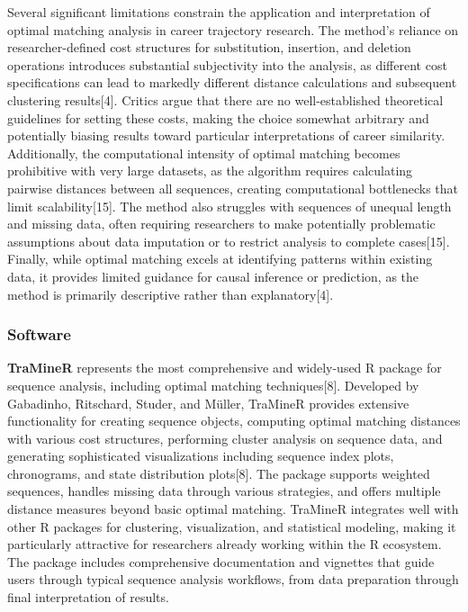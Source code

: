 \documentclass[./main.tex]{subfiles}
\begin{document}
Several significant limitations constrain the application and
interpretation of optimal matching analysis in career trajectory
research. The method's reliance on researcher-defined cost structures
for substitution, insertion, and deletion operations introduces
substantial subjectivity into the analysis, as different cost
specifications can lead to markedly different distance calculations and
subsequent clustering results{[}4{]}. Critics argue that there are no
well-established theoretical guidelines for setting these costs, making
the choice somewhat arbitrary and potentially biasing results toward
particular interpretations of career similarity. Additionally, the
computational intensity of optimal matching becomes prohibitive with
very large datasets, as the algorithm requires calculating pairwise
distances between all sequences, creating computational bottlenecks that
limit scalability{[}15{]}. The method also struggles with sequences of
unequal length and missing data, often requiring researchers to make
potentially problematic assumptions about data imputation or to restrict
analysis to complete cases{[}15{]}. Finally, while optimal matching
excels at identifying patterns within existing data, it provides limited
guidance for causal inference or prediction, as the method is primarily
descriptive rather than explanatory{[}4{]}.

\subsubsection{Software}\label{software}

\textbf{TraMineR} represents the most comprehensive and widely-used R
package for sequence analysis, including optimal matching
techniques{[}8{]}. Developed by Gabadinho, Ritschard, Studer, and
Müller, TraMineR provides extensive functionality for creating sequence
objects, computing optimal matching distances with various cost
structures, performing cluster analysis on sequence data, and generating
sophisticated visualizations including sequence index plots,
chronograms, and state distribution plots{[}8{]}. The package supports
weighted sequences, handles missing data through various strategies, and
offers multiple distance measures beyond basic optimal matching.
TraMineR integrates well with other R packages for clustering,
visualization, and statistical modeling, making it particularly
attractive for researchers already working within the R ecosystem. The
package includes comprehensive documentation and vignettes that guide
users through typical sequence analysis workflows, from data preparation
through final interpretation of results.
\end{document}
